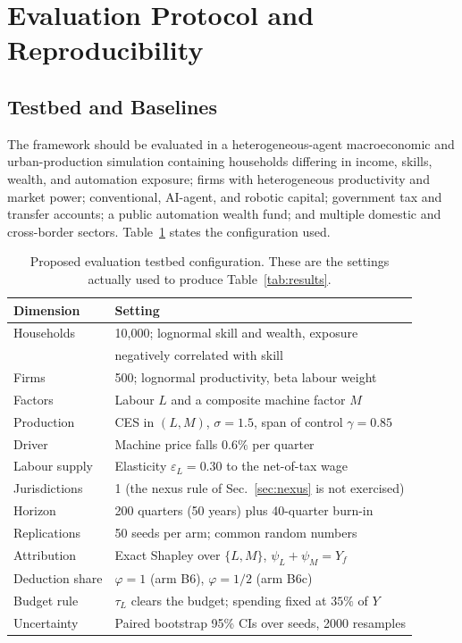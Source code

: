 \documentclass[journal]{IEEEtran}
\theoremstyle{plain}
\theoremstyle{definition}
\begin{document}
\section{Evaluation Protocol and Reproducibility}
\label{sec:eval}

\subsection{Testbed and Baselines}

The framework should be evaluated in a heterogeneous-agent macroeconomic and urban-production simulation containing households differing in income, skills, wealth, and automation exposure; firms with heterogeneous productivity and market power; conventional, AI-agent, and robotic capital; government tax and transfer accounts; a public automation wealth fund; and multiple domestic and cross-border sectors. Table~\ref{tab:config} states the configuration used.

\begin{table}[!t]
\centering
\caption{Proposed evaluation testbed configuration. These are the settings actually used to produce Table~\ref{tab:results}.}
\label{tab:config}
\footnotesize
\begin{tabular}{@{}l l@{}}
\toprule
\textbf{Dimension} & \textbf{Setting} \\
\midrule
Households & 10{,}000; lognormal skill and wealth, exposure \\
 & negatively correlated with skill \\
Firms & 500; lognormal productivity, beta labour weight \\
Factors & Labour $L$ and a composite machine factor $M$ \\
Production & CES in $(L,M)$, $\sigma=1.5$, span of control $\gamma=0.85$ \\
Driver & Machine price falls $0.6\%$ per quarter \\
Labour supply & Elasticity $\varepsilon_L=0.30$ to the net-of-tax wage \\
Jurisdictions & 1 (the nexus rule of Sec.~\ref{sec:nexus} is not exercised) \\
Horizon & 200 quarters (50 years) plus 40-quarter burn-in \\
Replications & 50 seeds per arm; common random numbers \\
Attribution & Exact Shapley over $\{L,M\}$, $\psi_L+\psi_M=Y_f$ \\
Deduction share & $\varphi=1$ (arm B6), $\varphi=1/2$ (arm B6c) \\
Budget rule & $\tau_L$ clears the budget; spending fixed at $35\%$ of $Y$ \\
Uncertainty & Paired bootstrap 95\% CIs over seeds, 2000 resamples \\
\bottomrule
\end{tabular}
\end{table}
\end{document}
